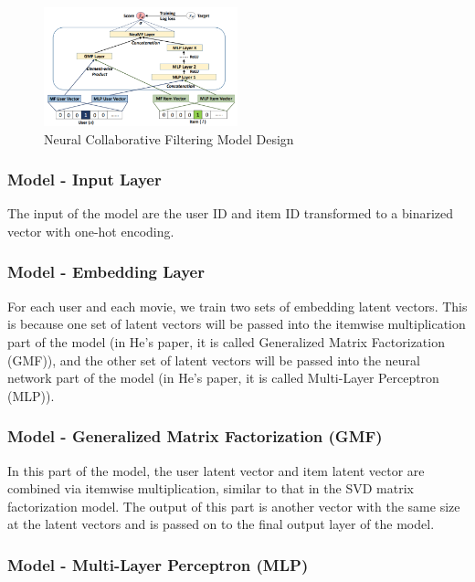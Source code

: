 \documentclass[final]{cvpr}
\begin{document}
\begin{figure}[h]
	\includegraphics[width=0.5\textwidth]{./NeuCF.PNG}
	\caption{Neural Collaborative Filtering Model Design \cite{he2017neural}}
\end{figure}

\subsubsection{Model - Input Layer}

The input of the model are the user ID and item ID transformed to a binarized vector with one-hot encoding.

\subsubsection{Model - Embedding Layer}

For each user and each movie, we train two sets of embedding latent vectors. This is because one set of latent
vectors will be passed into the itemwise multiplication part
of the model (in He’s paper, it is called Generalized Matrix
Factorization (GMF)), and the other set of latent vectors will
be passed into the neural network part of the model (in He’s
paper, it is called Multi-Layer Perceptron (MLP)).

\subsubsection{Model - Generalized Matrix Factorization (GMF)}

In this part of the model, the user latent vector and item latent vector are combined via itemwise multiplication, similar to that in the SVD matrix factorization model. The output of this part is another vector with the same size at the latent vectors and is passed on to the final output layer of the model.

\subsubsection{Model - Multi-Layer Perceptron (MLP)}
\end{document}
